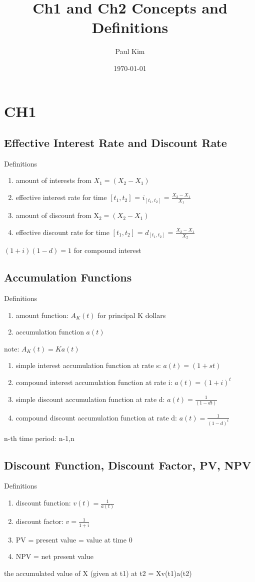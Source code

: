 \documentclass[12pt]{article}
\begin{document}
	
\title{Ch1 and Ch2 Concepts and Definitions}
\author{Paul Kim}
\date{\today}
\maketitle

\section{CH1}
\subsection{Effective Interest Rate and Discount Rate}
Definitions
\begin{enumerate}
	\item amount of interests from $X_1= (X_2 - X_1)$ 
	\item effective interest rate for time $[t_1, t_2]$ = $i_{[t_1,t_2]}$ = $\frac{X_2 - X_1}{X_1}$ 
	\item amount of discount from X$_2 = (X_2 - X_1)$ 
	\item effective discount rate for time $[t_1, t_2]$ = $d_{[t_1,t_2]}$ = $\frac{X_2 - X_1}{X_2}$ 
\end{enumerate}
$(1+i)(1-d) = 1$ for compound interest
\subsection{Accumulation Functions}
Definitions
\begin{enumerate}
	\item amount function: $A_K(t)$ for principal K dollars
	\item accumulation function $a(t)$ 
\end{enumerate}
note: $A_K(t) = Ka(t)$
\begin{enumerate}
	\item simple interest accumulation function at rate s: $a(t) = (1+st)$
	\item compound interest accumulation function at rate i: $a(t) = (1+i)^t$
	\item simple discount accumulation function at rate d: $a(t) = \frac{1}{(1-dt)}$
	\item compound discount accumulation function at rate d: $a(t) = \frac{1}{(1-d)^t}$
\end{enumerate}

n-th time period: n-1,n

\subsection{Discount Function, Discount Factor, PV, NPV}
Definitions
\begin{enumerate}
	\item discount function: $v(t) = \frac{1}{a(t)}$
	\item discount factor: $v = \frac{1}{1+i}$
	\item PV = present value = value at time 0
	\item NPV = net present value 
\end{enumerate}
the accumulated value of X (given at t1) at t2 = Xv(t1)a(t2)
\end{document}
